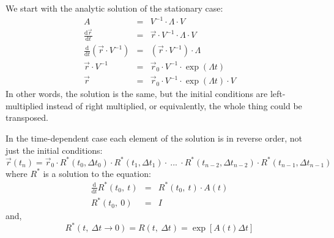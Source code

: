 \documentclass[11pt]{article}
\begin{document}
We start with the analytic solution of the stationary case:
\begin{eqnarray}
A & = & V^{-1} \cdot \Lambda \cdot V \\
\frac{\mathrm d \vec r}{\mathrm d t} & = & \vec r \cdot V^{-1} \cdot \Lambda \cdot V \\
\frac{\mathrm d}{\mathrm d t} (\vec r \cdot V^{-1}) & = & (\vec r \cdot V^{-1}) \cdot \Lambda \\
\vec r \cdot V^{-1} & = & \vec r_0 \cdot V^{-1} \cdot \exp (\Lambda t) \\
\vec r & = & \vec r_0 \cdot V^{-1} \cdot \exp (\Lambda t) \cdot V 
\end{eqnarray}
In other words, the solution is the same, but the initial conditions are
left-multiplied instead of right multiplied, or equivalently, the whole thing 
could be transposed.

In the time-dependent case each element of the solution is in reverse order,
not just the initial conditions:
\begin{equation}
\vec r(t_n) = \vec r_0 \cdot R^*(t_0,\Delta t_0) \cdot R^*(t_1, \Delta t_1) \cdot ~ ... 
~ \cdot R^*(t_{n-2},\Delta t_{n-2}) \cdot R^*(t_{n-1},\Delta t_{n-1})
\end{equation}
where $R^*$ is a solution to the equation:
\begin{eqnarray}
\frac{\mathrm d}{\mathrm d t}R^*(t_0,~t) & = & R^*(t_0, ~t) \cdot A(t) \\
R^*(t_0, ~ 0) & = & I
\end{eqnarray}
and,
\begin{equation}
R^*(t,~\Delta t \rightarrow 0) = R(t,~ \Delta t ) 
 = \exp \left [ A(t) \Delta t \right ]
\end{equation}
\end{document}
